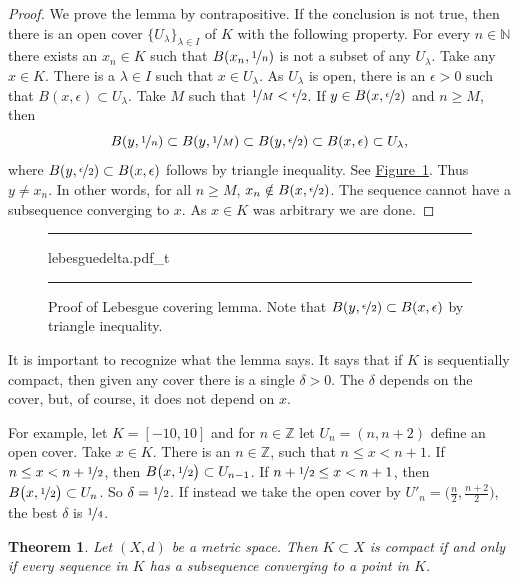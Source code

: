 \documentclass[12pt,openany]{book}
\newcommand{\Z}{{\mathbb{Z}}}
\newcommand{\N}{{\mathbb{N}}}
\theoremstyle{plain}
\newtheorem{thm}{Theorem}[section]
\theoremstyle{remark}
\theoremstyle{definition}
\newenvironment{myfig}{%
\begin{figure}[h!t]
\noindent\rule{\textwidth}{0.5pt}\vspace{12pt}\par\centering}%
{\par\noindent\rule{\textwidth}{0.5pt}
\end{figure}}
\theoremstyle{exercise}
\theoremstyle{example}
\newcommand{\figureref}[1]{\hyperref[#1]{Figure~\ref*{#1}}}
\begin{document}
\begin{proof}
We prove the lemma by contrapositive.
If the conclusion is not true, then
there is
an open cover $\{ U_\lambda \}_{\lambda \in I}$ of $K$ with
the following property.
For every $n \in \N$ there exists an $x_n \in K$ such that
$B(x_n,\nicefrac{1}{n})$ is not a subset of any $U_\lambda$.
Take any $x \in K$.  There is
a $\lambda \in I$ such that $x \in U_\lambda$.  As $U_\lambda$ is open,
there is an $\epsilon > 0$ 
such that $B(x,\epsilon) \subset U_\lambda$.  Take $M$ such that
$\nicefrac{1}{M} < \nicefrac{\epsilon}{2}$.  If $y \in 
B(x,\nicefrac{\epsilon}{2})$ and $n \geq M$, then 
\begin{equation*}
B(y,\nicefrac{1}{n}) \subset
B(y,\nicefrac{1}{M}) \subset
B(y,\nicefrac{\epsilon}{2}) \subset B(x,\epsilon)
\subset U_\lambda ,
\end{equation*}
where 
$B(y,\nicefrac{\epsilon}{2}) \subset B(x,\epsilon)$
follows by triangle inequality.
See \figureref{fig:lebesguedelta}.
Thus $y \not= x_n$.
In other words, for all $n \geq M$, $x_n \notin B(x,\nicefrac{\epsilon}{2})$. 
The sequence cannot have a subsequence converging to $x$.  As $x \in K$ was
arbitrary we are done.
\end{proof}

\begin{myfig}
{lebesguedelta.pdf_t}
\caption{Proof of Lebesgue covering lemma.
Note that $B(y,\nicefrac{\epsilon}{2}) \subset
B(x,\epsilon)$ by triangle inequality.\label{fig:lebesguedelta}}
\end{myfig}

It is important to recognize what the lemma says.  It says that
if $K$ is sequentially compact, then given any
cover there is a single $\delta > 0$.  The $\delta$ depends on the cover,
but, of course, it does not depend on $x$.

For example, let $K = [-10,10]$ and for $n \in \Z$ let $U_n =
(n,n+2)$ define an open cover.
Take $x \in K$. There is an $n \in \Z$, 
such that $n \leq x < n+1$.
If $n \leq x < n+\nicefrac{1}{2}$, then
$B\bigl(x,\nicefrac{1}{2}\bigr) \subset U_{n-1}$.
If $n+ \nicefrac{1}{2} \leq x < n+1$, then
$B\bigl(x,\nicefrac{1}{2}\bigr) \subset U_{n}$.  So $\delta =
\nicefrac{1}{2}$.  If instead we take the open cover by $U'_n =
\bigl(\frac{n}{2},\frac{n+2}{2} \bigr)$, the best $\delta$ is $\nicefrac{1}{4}$.

\begin{thm} \label{thm:mscompactisseqcpt}
Let $(X,d)$ be a metric space.  Then $K \subset X$ is compact if
and only if every sequence in $K$ has a subsequence converging to
a point in $K$.
\end{thm}
\end{document}
